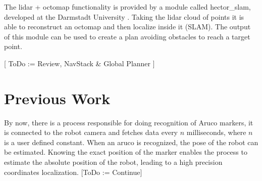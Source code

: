     The lidar + octomap functionality is provided by a module called hector\_slam, developed at the Darmstadt University \cite{hector_slam}. Taking the lidar cloud of points it is able to reconstruct an octomap and then localize inside it (SLAM). The output of this module can be used to create a plan avoiding obstacles to reach a target point.

    [ ToDo := Review, NavStack \& Global Planner ]

  \section{Previous Work} \label{ch_2:sect:3}

    By now, there is a process responsible for doing recognition of Aruco markers, it is connected to the robot camera and fetches data every $n$ milliseconds, where $n$ is a user defined constant. When an aruco is recognized, the pose of the robot can be estimated. Knowing the exact position of the marker enables the process to estimate the absolute position of the robot, leading to a high precision coordinates localization. [ToDo := Continue]

    \begin{comment}
      \begin{itemize}
      \end{itemize}
    \end{comment}

